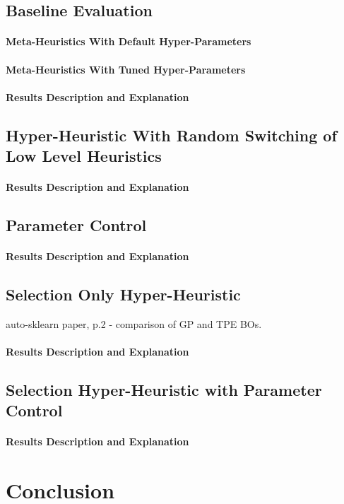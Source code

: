 \subsection{Baseline Evaluation}

\paragraph{Meta-Heuristics With Default Hyper-Parameters}

\paragraph{Meta-Heuristics With Tuned Hyper-Parameters}

\paragraph{Results Description and Explanation}


\subsection{Hyper-Heuristic With Random Switching of Low Level Heuristics}

\paragraph{Results Description and Explanation}


\subsection{Parameter Control}

\paragraph{Results Description and Explanation}


\subsection{Selection Only Hyper-Heuristic}
auto-sklearn paper, p.2 - comparison of GP and TPE BOs.

\paragraph{Results Description and Explanation}


\subsection{Selection Hyper-Heuristic with Parameter Control}

\paragraph{Results Description and Explanation}

\section{Conclusion}
